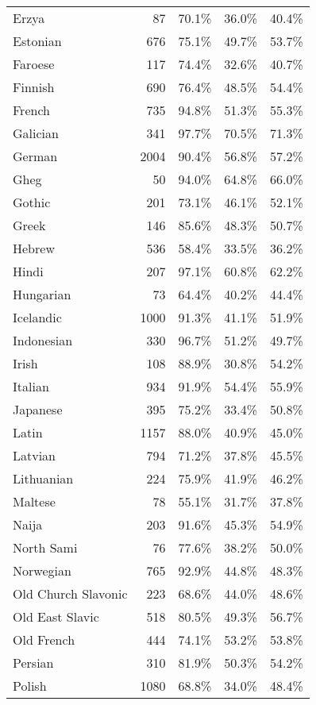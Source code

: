 \begin{longtable}{lrrrr}
    Erzya & 87 & 70.1\% & 36.0\% & 40.4\% \\
    Estonian & 676 & 75.1\% & 49.7\% & 53.7\% \\
    Faroese & 117 & 74.4\% & 32.6\% & 40.7\% \\
    Finnish & 690 & 76.4\% & 48.5\% & 54.4\% \\
    French & 735 & 94.8\% & 51.3\% & 55.3\% \\
    Galician & 341 & 97.7\% & 70.5\% & 71.3\% \\
    German & 2004 & 90.4\% & 56.8\% & 57.2\% \\
    Gheg & 50 & 94.0\% & 64.8\% & 66.0\% \\
    Gothic & 201 & 73.1\% & 46.1\% & 52.1\% \\
    Greek & 146 & 85.6\% & 48.3\% & 50.7\% \\
    Hebrew & 536 & 58.4\% & 33.5\% & 36.2\% \\
    Hindi & 207 & 97.1\% & 60.8\% & 62.2\% \\
    Hungarian & 73 & 64.4\% & 40.2\% & 44.4\% \\
    Icelandic & 1000 & 91.3\% & 41.1\% & 51.9\% \\
    Indonesian & 330 & 96.7\% & 51.2\% & 49.7\% \\
    Irish & 108 & 88.9\% & 30.8\% & 54.2\% \\
    Italian & 934 & 91.9\% & 54.4\% & 55.9\% \\
    Japanese & 395 & 75.2\% & 33.4\% & 50.8\% \\
    Latin & 1157 & 88.0\% & 40.9\% & 45.0\% \\
    Latvian & 794 & 71.2\% & 37.8\% & 45.5\% \\
    Lithuanian & 224 & 75.9\% & 41.9\% & 46.2\% \\
    Maltese & 78 & 55.1\% & 31.7\% & 37.8\% \\
    Naija & 203 & 91.6\% & 45.3\% & 54.9\% \\
    North Sami & 76 & 77.6\% & 38.2\% & 50.0\% \\
    Norwegian & 765 & 92.9\% & 44.8\% & 48.3\% \\
    Old Church Slavonic & 223 & 68.6\% & 44.0\% & 48.6\% \\
    Old East Slavic & 518 & 80.5\% & 49.3\% & 56.7\% \\
    Old French & 444 & 74.1\% & 53.2\% & 53.8\% \\
    Persian & 310 & 81.9\% & 50.3\% & 54.2\% \\
    Polish & 1080 & 68.8\% & 34.0\% & 48.4\% \\

\end{longtable}
